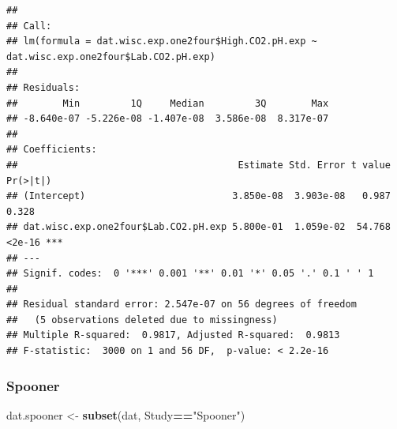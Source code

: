 \documentclass[]{article}
\newenvironment{Shaded}{\begin{snugshade}}{\end{snugshade}}
\newcommand{\KeywordTok}[1]{\textcolor[rgb]{0.13,0.29,0.53}{\textbf{#1}}}
\newcommand{\NormalTok}[1]{#1}
\newcommand{\OperatorTok}[1]{\textcolor[rgb]{0.81,0.36,0.00}{\textbf{#1}}}
\newcommand{\StringTok}[1]{\textcolor[rgb]{0.31,0.60,0.02}{#1}}
\begin{document}
\begin{Shaded}
\end{Shaded}

\begin{verbatim}
## 
## Call:
## lm(formula = dat.wisc.exp.one2four$High.CO2.pH.exp ~ dat.wisc.exp.one2four$Lab.CO2.pH.exp)
## 
## Residuals:
##        Min         1Q     Median         3Q        Max 
## -8.640e-07 -5.226e-08 -1.407e-08  3.586e-08  8.317e-07 
## 
## Coefficients:
##                                       Estimate Std. Error t value Pr(>|t|)    
## (Intercept)                          3.850e-08  3.903e-08   0.987    0.328    
## dat.wisc.exp.one2four$Lab.CO2.pH.exp 5.800e-01  1.059e-02  54.768   <2e-16 ***
## ---
## Signif. codes:  0 '***' 0.001 '**' 0.01 '*' 0.05 '.' 0.1 ' ' 1
## 
## Residual standard error: 2.547e-07 on 56 degrees of freedom
##   (5 observations deleted due to missingness)
## Multiple R-squared:  0.9817, Adjusted R-squared:  0.9813 
## F-statistic:  3000 on 1 and 56 DF,  p-value: < 2.2e-16
\end{verbatim}

\hypertarget{spooner}{%
\subsubsection{Spooner}\label{spooner}}

\begin{Shaded}
\begin{Highlighting}[]
\NormalTok{dat.spooner <-}\StringTok{ }\KeywordTok{subset}\NormalTok{(dat, Study}\OperatorTok{==}\StringTok{"Spooner"}\NormalTok{)}
\end{Highlighting}
\end{Shaded}
\end{document}
